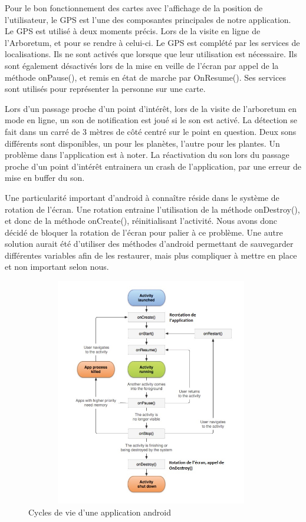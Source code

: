 \documentclass[a4paper,11pt]{article}
\begin{document}
		Pour le bon fonctionnement des cartes avec l’affichage de la position de l'utilisateur, le GPS est l'une des composantes principales de notre application. Le GPS est utilisé à deux moments précis. Lors de la visite en ligne de l'Arboretum, et pour se rendre à celui-ci. Le GPS est complété par les services de localisations. Ils ne sont activés que lorsque que leur utilisation est nécessaire. Ils sont également désactivés lors de la mise en veille de l'écran par appel de la méthode onPause(), et remis en état de marche par OnResume(). Ses services sont utilisés pour représenter la personne sur une carte.
		
		Lors d'un passage proche d'un point d'intérêt, lors de la visite de l'arboretum en mode en ligne, un son de notification est joué si le son est activé. La détection se fait dans un carré de 3 mètres de côté centré sur le point en question. Deux sons différents sont disponibles, un pour les planètes, l'autre pour les plantes. Un problème dans l'application est à noter. La réactivation du son lors du passage proche d'un point d'intérêt entrainera un crash de l'application, par une erreur de mise en buffer du son.
		
		Une particularité important d'android à connaître réside dans le système de rotation de l'écran. Une rotation entraine l'utilisation de la méthode onDestroy(), et donc de la méthode onCreate(), réinitialisant l'activité. Nous avons donc décidé de bloquer la rotation de l'écran pour palier à ce problème. Une autre solution aurait été d'utiliser des méthodes d'android permettant de sauvegarder différentes variables afin de les restaurer, mais plus compliquer à mettre en place et non important selon nous.
		
		 \begin{figure}[H]
     \begin{center}
      \includegraphics[width=11cm,height=10cm]{cyclerotation.jpg}
      \caption{Cycles de vie d'une application android}
     \end{center}
    \end{figure}
		
\end{document}
